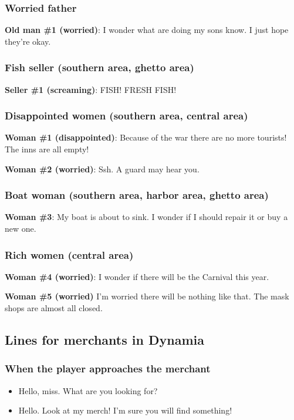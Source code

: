 \subsubsection*{Worried father}
\textbf{Old man \#{}1 (worried)}: I wonder what are doing my sons know. I just hope they're okay.

\subsubsection*{Fish seller (southern area, ghetto area)}
\textbf{Seller \#{}1 (screaming)}: FISH! FRESH FISH!

\subsubsection*{Disappointed women (southern area, central area)}
\textbf{Woman \#{}1 (disappointed)}: Because of the war there are no more tourists! The inns are all empty!

\textbf{Woman \#{}2 (worried)}: Ssh. A guard may hear you.

\subsubsection*{Boat woman (southern area, harbor area, ghetto area)}
\textbf{Woman \#{}3}: My boat is about to sink. I wonder if I should repair it or buy a new one.

\subsubsection*{Rich women (central area)}
\textbf{Woman \#{}4 (worried)}: I wonder if there will be the Carnival this year.

\textbf{Woman \#{}5 (worried)} I'm worried there will be nothing like that. The mask shops are almost all closed.

\subsection{Lines for merchants in Dynamia}
\subsubsection*{When the player approaches the merchant}
\begin{itemize}
\item Hello, miss. What are you looking for?

\item Hello. Look at my merch! I'm sure you will find something!
\end{itemize}


